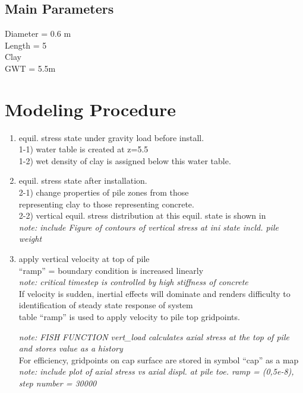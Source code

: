 \documentclass[a4paper, nobind]{templates/ociamthesis}
\begin{document}
\hypertarget{main-parameters}{%
\subsection{Main Parameters}\label{main-parameters}}

Diameter = 0.6 m\\
Length = 5\\
Clay\\
GWT = 5.5m\\

\hypertarget{modeling-procedure}{%
\section{Modeling Procedure}\label{modeling-procedure}}

\begin{enumerate}
\def\labelenumi{\arabic{enumi})}
\item
  equil. stress state under gravity load before install.\\
  1-1) water table is created at z=5.5\\
  1-2) wet density of clay is assigned below this water table.\\
\item
  equil. stress state after installation.\\
  2-1) change properties of pile zones from those\\
  representing clay to those representing concrete.\\
  2-2) vertical equil. stress distribution at this equil. state is
  shown in\\
  \emph{note: include Figure of contours of vertical stress at ini state
  incld. pile weight}\\
\item
  apply vertical velocity at top of pile\\
  ``ramp'' = boundary condition is increased linearly\\
  \emph{note: critical timestep is controlled by high stiffness of
  concrete}\\
  If velocity is sudden, inertial effects will dominate and renders
  difficulty to identification of steady state response of system\\
  table ``ramp'' is used to apply velocity to pile top gridpoints.

  \hfill\break
  \emph{note: FISH FUNCTION vert\_load calculates axial stress at the top of
  pile and stores value as a history}\\
  For efficiency, gridpoints on cap surface are stored in symbol ``cap''
  as a map\\
  \emph{note: include plot of axial stress vs axial displ. at pile toe.
  ramp = (0,5e-8), step number = 30000}


\end{enumerate}
\end{document}
